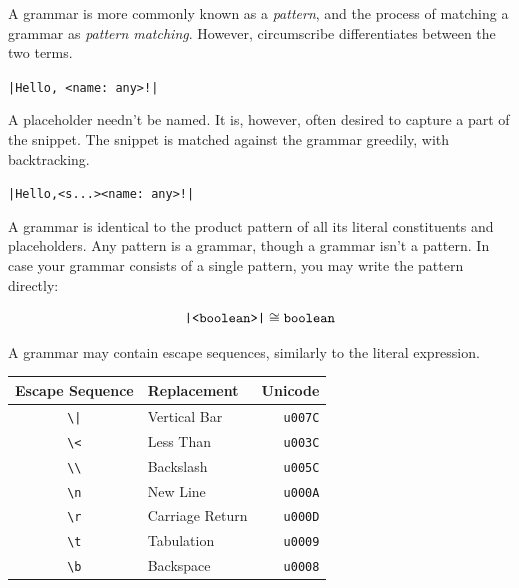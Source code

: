 \documentclass{article}
\begin{document}
A grammar is more commonly known as a \emph{pattern}, and the process of matching a grammar
as \emph{pattern matching}. However, circumscribe differentiates between the two terms.

\begin{center}
    \verb/|Hello, <name: any>!|/
\end{center}

A placeholder needn't be named. It is, however, often desired to capture a part of the snippet. The snippet is matched
against the grammar greedily, with backtracking.

\begin{center}
    \verb/|Hello,<s...><name: any>!|/
\end{center}

A grammar is identical to the product pattern of all its literal constituents
and placeholders. Any pattern is a grammar, though a grammar isn't a pattern. In case your grammar consists of a
single pattern, you may write the pattern directly:

\begin{center}
    \[\verb/|<boolean>|/ \cong \verb/boolean/\] 
\end{center}

A grammar may contain escape sequences, similarly to the literal expression.

\begin{center}
\begin{tabular}{ c|l r }
    \hline
    Escape Sequence & Replacement & Unicode \\[1ex]
    \hline
    \verb/\|/ & Vertical Bar    & \texttt{u007C} \\ 
    \verb|\<| & Less Than       & \texttt{u003C} \\
    \verb|\\| & Backslash       & \texttt{u005C} \\
    \verb|\n| & New Line        & \texttt{u000A} \\ 
    \verb|\r| & Carriage Return & \texttt{u000D} \\ 
    \verb|\t| & Tabulation      & \texttt{u0009} \\ 
    \verb|\b| & Backspace       & \texttt{u0008} \\
\end{tabular}
\end{center}
\end{document}
